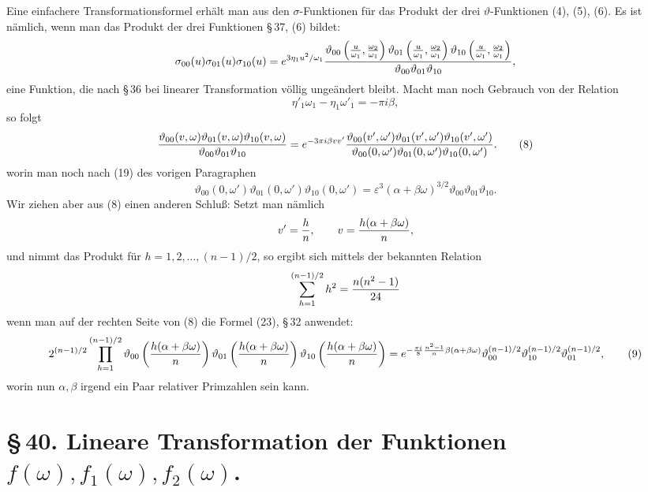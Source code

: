 \documentclass[11pt]{article}
\providecommand{\tht}{\vartheta}
\begin{document}
Eine einfachere Transformationsformel erhält man aus den $\sigma$-Funktionen für das Produkt der drei $\vartheta$-Funktionen (4), (5), (6). Es ist nämlich, wenn man das Produkt der drei Funktionen \S\,37, (6) bildet:
\[
{\sigma_{00}(u)\sigma_{01}(u)\sigma_{10}(u)}
=
 e^{3\eta_1u^2/\omega_1}
{\tht_{00}\left({u\over\omega_1},{\omega_2\over\omega_1}\right)
\tht_{01}\left({u\over\omega_1},{\omega_2\over\omega_1}\right)
\tht_{10}\left({u\over\omega_1},{\omega_2\over\omega_1}\right)
\over\tht_{00}\tht_{01}\tht_{10}},
\]
eine Funktion, die nach \S\,36 bei linearer Transformation völlig ungeändert bleibt. Macht man noch Gebrauch von der Relation
\[
\eta'_1\omega_1-\eta_1\omega'_1=-\pi i\beta,
\]
so folgt
\begin{equation}
{\tht_{00}(v,
\omega)\tht_{01}(v,
\omega)\tht_{10}(v,
\omega)\over\tht_{00}\tht_{01}\tht_{10}}
=e^{-3\pi i\beta vv'}
{\tht_{00}(v',\omega')\tht_{01}(v',\omega')\tht_{10}(v',\omega')
\over\tht_{00}(0,
\omega')\tht_{01}(0,
\omega')\tht_{10}(0,
\omega')}. 
\tag{8}
\end{equation}
worin man noch nach (19) des vorigen Paragraphen
\[
\tht_{00}(0,
\omega')\tht_{01}(0,
\omega')\tht_{10}(0,
\omega')=
\varepsilon^3(\alpha+
\beta\omega)^{3/2}\tht_{00}\tht_{01}\tht_{10}.
\]
Wir ziehen aber aus (8) einen anderen Schluß: Setzt man nämlich
\[
v'={h\over n},
\qquad
v={h(\alpha+
\beta\omega)
\over n},
\]
und nimmt das Produkt für $h=1,2,\ldots,(n-1)/2$, so ergibt sich mittels der bekannten Relation
\[
\sum_{h=1}^{(n-1)/2}h^2={n(n^2-1)\over24}
\]
wenn man auf der rechten Seite von (8) die Formel (23), \S\,32 anwendet:
\begin{equation}
2^{(n-1)/2}
\prod_{h=1}^{(n-1)/2}
\tht_{00}\left({h(\alpha+
\beta\omega)\over n}\right)
\tht_{01}\left({h(\alpha+
\beta\omega)\over n}\right)
\tht_{10}\left({h(\alpha+
\beta\omega)\over n}\right)
=e^{-\frac{\pi i}{8}{n^2-1\over n}\beta(\alpha+
\beta\omega)}
\tht_{00}^{(n-1)/2}\tht_{10}^{(n-1)/2}\tht_{01}^{(n-1)/2},
\tag{9}
\end{equation}
worin nun $\alpha,\beta$ irgend ein Paar relativer Primzahlen sein kann.

\section*{\S\,40. Lineare Transformation der Funktionen $f(\omega), f_1(\omega), f_2(\omega)$.}
\end{document}
